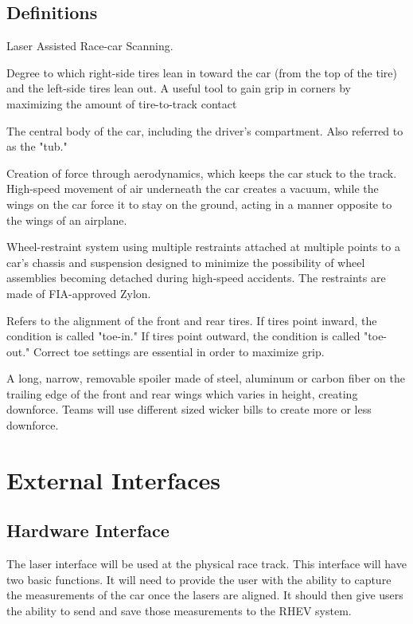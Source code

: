 \documentclass[draftclsnofoot,onecolumn,letterpaper,10pt,compsoc]{IEEEtran}
\begin{document}
\subsection{Definitions}
\begin{description}[font=$\bullet$~]
\item[LARS:] Laser Assisted Race-car Scanning.
\item  [Camber:] Degree to which right-side tires lean in toward the car (from the top of the tire) and the left-side tires lean out. A useful tool to gain grip in corners by maximizing the amount of tire-to-track contact
\item[Chassis:] The central body of the car, including the driver's compartment. Also referred to as the "tub."\cite{indycarterm}
\item[Downforce:] Creation of force through aerodynamics, which keeps the car stuck to the track. High-speed movement of air underneath the car creates a vacuum, while the wings on the car force it to stay on the ground, acting in a manner opposite to the wings of an airplane.
\item[Suspension \& Wheel Energy Management System (SWEMS):] Wheel-restraint system using multiple restraints attached at multiple points to a car’s chassis and suspension designed to minimize the possibility of wheel assemblies becoming detached during high-speed accidents. The restraints are made of FIA-approved Zylon.
\item[Toe:] Refers to the alignment of the front and rear tires. If tires point inward, the condition is called "toe-in." If tires point outward, the condition is called "toe-out." Correct toe settings are essential in order to maximize grip.
\item[Wicker Bill:] A long, narrow, removable spoiler made of steel, aluminum or carbon fiber on the trailing edge of the front and rear wings which varies in height, creating downforce. Teams will use different sized wicker bills to create more or less downforce.
\end{description}

\section{External Interfaces}

\subsection{Hardware Interface}
The laser interface will be used at the physical race track.  This interface will have two basic functions.  It will need to provide the user with the ability to capture the measurements of the car once the lasers are aligned.  It should then give users the ability to send and save those measurements to the RHEV system. 
\end{document}
